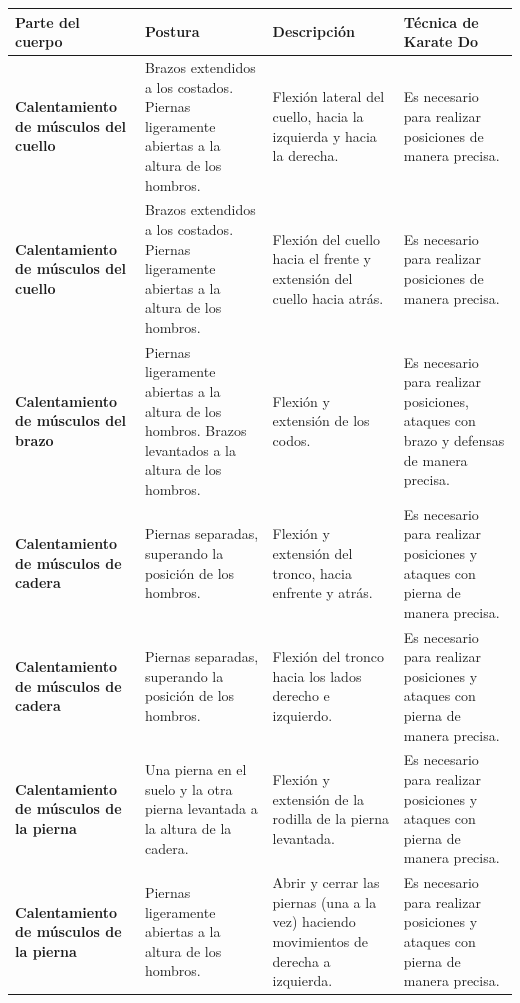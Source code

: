 \begin{table}[H]
\centering
\begin{tabular}{| p{3 cm} | p{4 cm} | p{4 cm} | p{4 cm} |}
\hline
\rowcolor[rgb]{0.529412, 0.807843, 0.980392} {\textbf{Parte del cuerpo}} & {\textbf{Postura}} & {\textbf{Descripción}} & {\textbf{Técnica de Karate Do}}\\
\hline
\textbf{Calentamiento de músculos del cuello} &  Brazos extendidos a los costados.
Piernas ligeramente abiertas a la altura de los hombros. & Flexión lateral del cuello, hacia la izquierda y hacia la derecha. & Es necesario para realizar posiciones de manera precisa.\\
\hline
\textbf{Calentamiento de músculos del cuello} & Brazos extendidos a los costados.
Piernas ligeramente abiertas a la altura de los hombros. & Flexión del cuello hacia el frente y extensión del cuello hacia atrás. & Es necesario para realizar posiciones de manera precisa.\\
\hline
\textbf{Calentamiento de músculos del brazo} & Piernas ligeramente abiertas a la altura de los hombros.
Brazos levantados a la altura de los hombros. & Flexión y extensión de los codos. & Es necesario para realizar posiciones, ataques con brazo y defensas de manera precisa.\\
\hline
\textbf{Calentamiento de músculos de cadera} & Piernas separadas, superando la posición de los hombros. & Flexión y extensión del tronco, hacia enfrente y atrás. & Es necesario para realizar posiciones y ataques con pierna de manera precisa.\\		
\hline
\textbf{Calentamiento de músculos de cadera} & Piernas separadas, superando la posición de los hombros. & Flexión del tronco hacia los lados derecho e izquierdo. & Es necesario para realizar posiciones y ataques con pierna de manera precisa.\\
\hline
\textbf{Calentamiento de músculos de la pierna} & Una pierna en el suelo y la otra pierna levantada a la altura de la cadera. & Flexión y extensión de la rodilla de la pierna levantada. & Es necesario para realizar posiciones y ataques con pierna de manera precisa.\\
\hline
\textbf{Calentamiento de músculos de la pierna} & Piernas ligeramente abiertas a la altura de los hombros. & Abrir y cerrar las piernas (una a la vez) haciendo movimientos de derecha a izquierda.& Es necesario para realizar posiciones y ataques con pierna de manera precisa.\\
\hline


\end{tabular}
\label{tab:DEC}
\end{table} 

